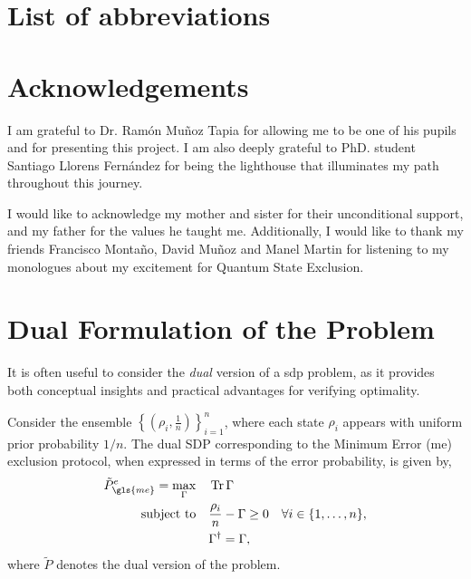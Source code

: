 \documentclass[12pt,letterpaper]{article}
\DeclareMathOperator{\tr}{Tr}
\begin{document}
\section*{List of abbreviations}
\renewcommand{\glsnamefont}[1]{\textbf{#1}}
\printnoidxglossary[type=main, title={\vspace{-1cm}}, nonumberlist, nogroupskip, style=super]

\section*{Acknowledgements}

\hspace{20pt}I am grateful to Dr. Ramón Muñoz Tapia for allowing me to be one of his pupils and for presenting this project. I am also deeply grateful to PhD. student Santiago Llorens Fernández for being the lighthouse that illuminates my path throughout this journey.

I would like to acknowledge my mother and sister for their unconditional support, and my father for the values he taught me. Additionally, I would like to thank my friends Francisco Montaño, David Muñoz and Manel Martin for listening to my monologues about my excitement for Quantum State Exclusion.


\newpage
\appendix

\section{Dual Formulation of the Problem}\label{sectionDualFormulationOfTheProblem}

\hspace{20pt}It is often useful to consider the \emph{dual} version of a \gls{sdp} problem, as it provides both conceptual insights and practical advantages for verifying optimality. 

Consider the ensemble $\left\{ \left( \rho_i, \frac{1}{n} \right) \right\}_{i=1}^n$, where each state $\rho_i$ appears with uniform prior probability $1/n$. The dual SDP corresponding to the Minimum Error (\gls{me}) exclusion protocol, when expressed in terms of the error probability, is given by,
\begin{align*}
	\tilde{P}_{\gls{me}}^e = \max_{\Gamma} \quad & \tr{\Gamma} \\
	\text{subject to} \quad & \frac{\rho_i}{n} - \Gamma \geq 0 \quad \forall i \in \{1, \dots, n\}, \\
	& \Gamma^\dagger = \Gamma,
\end{align*}
where $\tilde{P}$ denotes the dual version of the problem.
\end{document}
